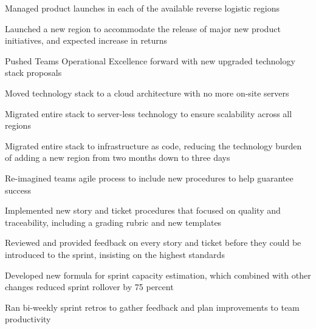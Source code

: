 \documentclass[11pt, a4paper]{awesomecv}
\begin{document}
\begin{cventries}
{\begin{cvitems}
                    \item{Managed product launches in each of the available reverse logistic regions}
                    \item{Launched a new region to accommodate the release of major new product initiatives, and expected increase in returns}
                    \item{Pushed Team\textquotesingle s Operational Excellence forward with new upgraded technology stack proposals}
                    \begin{cvitemssub}
                        \item{Moved technology stack to a cloud architecture with no more on-site servers}
                        \item{Migrated entire stack to server-less technology to ensure scalability across all regions}
                        \item{Migrated entire stack to infrastructure as code, reducing the technology burden of adding a new region from two months down to three days}
                    \end{cvitemssub}
                    \item{Re-imagined teams agile process to include new procedures to help guarantee success}
                    \item{Implemented new story and ticket procedures that focused on quality and traceability, including a grading rubric and new templates}
                    \item{Reviewed and provided feedback on every story and ticket before they could be introduced to the sprint, insisting on the highest standards}
                    \item{Developed new formula for sprint capacity estimation, which combined with other changes reduced sprint rollover by 75 percent}
                    \item{Ran bi-weekly sprint retros to gather feedback and plan improvements to team productivity}

\end{cvitems}}
\end{cventries}
\end{document}

